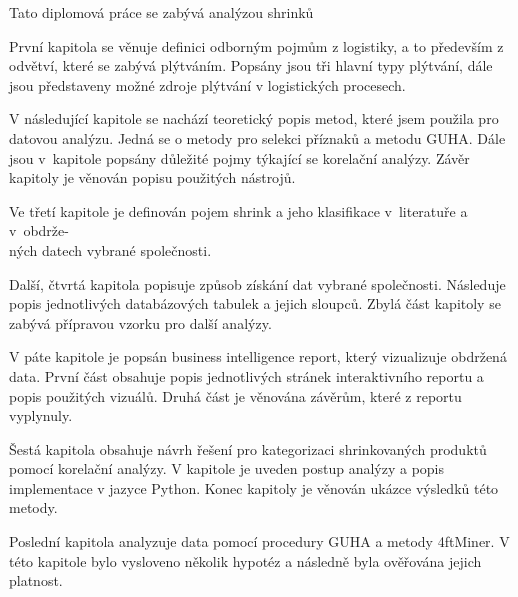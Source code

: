 Tato diplomová práce se zabývá analýzou shrinků 


První kapitola se věnuje definici odborným pojmům z logistiky, a to především z odvětví, které se zabývá plýtváním. Popsány jsou tři hlavní typy plýtvání, dále jsou představeny možné zdroje plýtvání v logistických procesech.

V následující kapitole se nachází teoretický popis metod, které jsem použila pro datovou analýzu. Jedná se o metody pro selekci příznaků a metodu GUHA. Dále jsou v~kapitole popsány důležité pojmy týkající se korelační analýzy. Závěr kapitoly je věnován popisu použitých nástrojů.

Ve třetí kapitole je definován pojem shrink a jeho klasifikace v~literatuře a v~obdrže-\\ných datech vybrané společnosti.

Další, čtvrtá kapitola popisuje způsob získání dat vybrané společnosti. Následuje popis jednotlivých databázových tabulek a jejich sloupců. Zbylá část kapitoly se zabývá přípravou vzorku pro další analýzy.

V páte kapitole je popsán business intelligence report, který vizualizuje obdržená data. První část obsahuje popis jednotlivých stránek interaktivního reportu a popis použitých vizuálů. Druhá část je věnována závěrům, které z reportu vyplynuly.

Šestá kapitola obsahuje návrh řešení pro kategorizaci shrinkovaných produktů pomocí korelační analýzy. V kapitole je uveden postup analýzy a popis implementace v jazyce Python. Konec kapitoly je věnován ukázce výsledků této metody.

Poslední kapitola analyzuje data pomocí procedury GUHA a metody 4ftMiner. V této kapitole bylo vysloveno několik hypotéz a následně byla ověřována jejich platnost.






